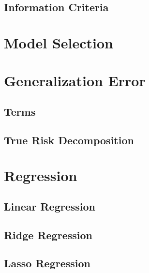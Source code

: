 \documentclass[18pt,a3paper,landscape, ncols=3]{cheatsheet}
\begin{document}
	\subsection{Information Criteria}
		\begin{mdframed}
		\end{mdframed}

\section{Model Selection} \seperator
	\begin{mdframed}
	\end{mdframed}

\section{Generalization Error} \seperator
	\subsection{Terms}
		\begin{mdframed}
		\end{mdframed}
	\subsection{True Risk Decomposition}
		\begin{mdframed}
		\end{mdframed}

\section{Regression} \seperator
	\subsection{Linear Regression}
		\begin{mdframed}
		\end{mdframed}
	\subsection{Ridge Regression}
		\begin{mdframed}
		\end{mdframed}
	\subsection{Lasso Regression}
		\begin{mdframed}
		\end{mdframed}
\end{document}
